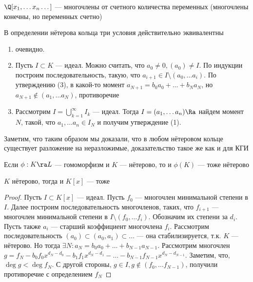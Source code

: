 
\begin{example}
    \(\Q[x_1, \dots x_n \dots]\) --- многочлены от счетного количества переменных (многочлены конечны, но переменных счетно)
\end{example}

\begin{proposition}
    В определении нётерова кольца три условия действительно эквивалентны
\end{proposition}
\begin{proposition}\indent
    \begin{enumerate}
        \item[\((1) \Ra (3)\)] очевидно.
        \item[\((3) \Ra (2)\)] Пусть \(I \subset K\) --- идеал. Можно считать, что \(a_0 \ne 0, (a_0) \ne I\). По индукции построим последовательность, такую, что \(a_{i + 1} \in I \setminus(a_0, \dots a_i)\). По утверждению (3), в какой-то момент \(a_{N + 1} = b_0a_0 + \dots + b_Na_N\), но \(a_{N + 1} \notin (a_1, \dots a_N)\), противоречие
        \item[\((2) \Ra (1)\)] Рассмотрим \(I = \bigcup_{k = 1}^\infty I_k\) --- идеал. Тогда \(I = (a_1, \dots a_n) \Ra\) найдем момент \(N\), такой, что \(a_1, \dots a_n \in I_N\) и получим утверждение (1).
    \end{enumerate}
\end{proposition}

\begin{note}
    Заметим, что таким образом мы доказали, что в любом нётеровом кольце существует разложение на неразложимые, доказательство такое же как и для КГИ
\end{note}

\begin{corollary}
    Если \(\phi: K \ra L\) --- гомоморфизм и \(K\) --- нётерово, то и \(\phi(K)\) --- тоже нётерово
\end{corollary}

\begin{theorem}
    \(K\) нётерово, тогда и \(K[x]\) --- тоже
\end{theorem}
\begin{proof}
    Пусть \(I \subset K[x]\) --- идеал. Пусть \(f_0\) --- многочлен минимальной степени в \(I\). Далее построим последовательность многочленов, таких, что \(f_{i + 1}\) --- многочлен минимальной степени в \(I \setminus (f_0, \dots f_i)\). Обозначим их степени за \(d_i\). Пусть также \(a_i\) --- старший коэффициент многочлена \(f_i\). Рассмотрим последовательность \((a_0) \subset (a_0, a_1) \subset \dots\) --- она стабилизируется, т.к. \(K\) --- нётерово. Но тогда \(\exists N: a_N = b_0a_0 + \dots + b_{N - 1}a_{N - 1}\). Рассмотрим многочлен \(g = f_N - b_0f_0x^{d_N - d_0} - b_1f_1x^{d_N - d_1} - \dots - b_{N - 1}f_{N - 1}x^{d_N - d_{N - 1}}\). Заметим, что, \(\deg g < \deg f_N\). С другой стороны, \(g \in I, g \notin (f_0, \dots f_{N - 1})\), получили противоречие с определением \(f_N\)
\end{proof}

